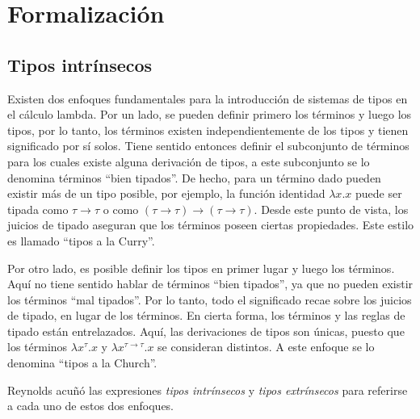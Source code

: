 \newcommand{\const}[1]{\AgdaInductiveConstructor{#1}}
\newcommand{\bound}[1]{\AgdaBound{#1}}
\newcommand{\func}[1]{\AgdaFunction{#1}}
\newcommand{\type}[1]{\AgdaDatatype{#1}}
\newcommand{\snstar}{\type{SN*} \func{⟦\_⟧} }
\newcommand{\cand}[1]{\func{⟦}#1\func{⟧}}

\newcommand{\parens}[1]{\AgdaSymbol{(}#1\AgdaSymbol{)}}
\newcommand{\subst}[2]{\func{⟪}\AgdaSpace{}#1\AgdaSpace{}\func{⟫}\AgdaSpace{}#2}
\newcommand{\cons}[2]{#1 \func{•} #2}
\newcommand{\ids}{\func{ids}}
\newcommand{\comp}[2]{#1 \func{∘} #2}


\section{Formalización}

\subsection{Tipos intrínsecos}

Existen dos enfoques fundamentales para la introducción de sistemas de tipos en el cálculo lambda.
Por un lado, se pueden definir primero los términos y luego los tipos, por lo tanto, los términos existen independientemente de los tipos y tienen significado por sí solos.
Tiene sentido entonces definir el subconjunto de términos para los cuales existe alguna derivación de tipos, a este subconjunto se lo denomina términos ``bien tipados''.
De hecho, para un término dado pueden existir más de un tipo posible, por ejemplo, la función identidad $\lambda x.x$ puede ser tipada como $\tau \rightarrow \tau$ o como $(\tau \rightarrow \tau) \rightarrow (\tau \rightarrow \tau)$.
Desde este punto de vista, los juicios de tipado aseguran que los términos poseen ciertas propiedades.
Este estilo es llamado ``tipos a la Curry''.

Por otro lado, es posible definir los tipos en primer lugar y luego los términos.
Aquí no tiene sentido hablar de términos ``bien tipados'', ya que no pueden existir los términos ``mal tipados''.
Por lo tanto, todo el significado recae sobre los juicios de tipado, en lugar de los términos.
En cierta forma, los términos y las reglas de tipado están entrelazados.
Aquí, las derivaciones de tipos son únicas, puesto que los términos $\lambda x^\tau.x$ y $\lambda x^{\tau \rightarrow \tau}.x$ se consideran distintos.
A este enfoque se lo denomina ``tipos a la Church''.

Reynolds \cite{reynolds_1998} acuñó las expresiones \textit{tipos intrínsecos} y \textit{tipos extrínsecos} para referirse a cada uno de estos dos enfoques.

